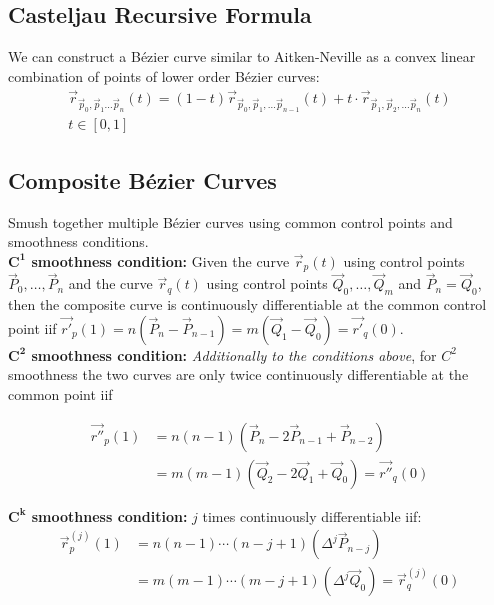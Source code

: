 \subsection{Casteljau Recursive Formula}
We can construct a B\'ezier curve similar to Aitken-Neville as a convex linear combination of points of lower order B\'ezier curves:
\begin{align*}
	\vec{r}_{\vec{p}_{0},\vec{p}_{1}\ldots\vec{p}_{n}}(t)
	= (1-t)\vec{r}_{\vec{p}_{0},\vec{p}_{1},\ldots\vec{p}_{n-1}}(t)+t\cdot\vec{r}_{\vec{p}_{1},\vec{p}_{2},\ldots\vec{p}_{n}}(t) \\
	t\in[0,1]
\end{align*}



\subsection{Composite B\'ezier Curves}
Smush together multiple B\'ezier curves using common control points and smoothness conditions.
\\[1em]
\textbf{$\mathbf{C^1}$ smoothness condition:}
Given the curve $\vec{r}_p(t)$ using control points $\vec{P}_0,\ldots,\vec{P}_n$
and the curve $\vec{r}_q(t)$ using control points $\vec{Q}_0,\ldots,\vec{Q}_m$
and $\vec{P}_n=\vec{Q}_0$, then the composite curve is continuously differentiable at the common control point iif
\colorbox{shadecolor}{$\vec{r'}_p(1) = n(\vec{P}_n - \vec{P}_{n-1}) = m(\vec{Q}_1 - \vec{Q}_0) = \vec{r'}_q(0)$}.
\\[1em]
\textbf{$\mathbf{C^2}$ smoothness condition:}
\emph{Additionally to the conditions above},
for $C^2$ smoothness the two curves are only twice continuously differentiable at the common point iif
\begin{snugshade*}
	\begin{align*}
		\vec{r''}_p(1) & = n(n-1)\left(\vec{P}_n-2\vec{P}_{n-1}+\vec{P}_{n-2}\right) \\
		& = m(m-1)\left(\vec{Q}_2 - 2\vec{Q}_1 + \vec{Q}_0\right) = \vec{r''}_q(0)
	\end{align*}
\end{snugshade*}
\textbf{$\mathbf{C^k}$ smoothness condition:}
$j$ times continuously differentiable iif:
\begin{align*}
	\vec{r}^{(j)}_p(1) & = n(n-1)\cdots(n-j+1)(\Delta^{j}\vec{P}_{n-j}) \\
	& = m(m-1)\cdots(m-j+1)(\Delta^{j}\vec{Q}_{0}) = \vec{r}^{(j)}_q(0)
\end{align*}
